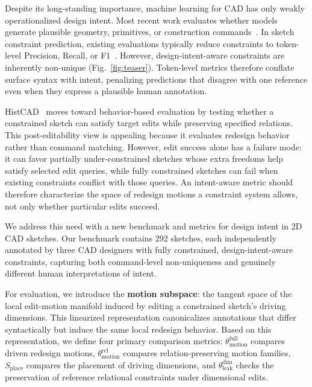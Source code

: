 Despite its long-standing importance, machine learning for CAD has only weakly operationalized design intent. Most recent work evaluates whether models generate plausible geometry, primitives, or construction commands~\cite{Wu_2021_ICCV,rukhovich2025cad}. In sketch constraint prediction, existing evaluations typically reduce constraints to token-level Precision, Recall, or F1~\cite{seff2021vitruvion,lin2026unisketch}. However, design-intent-aware constraints are inherently non-unique (Fig.~\ref{fig:teaser}). Token-level metrics therefore conflate surface syntax with intent, penalizing predictions that disagree with one reference even when they express a plausible human annotation.

HistCAD~\cite{dong2025histcad} moves toward behavior-based evaluation by testing whether a constrained sketch can satisfy target edits while preserving specified relations. This post-editability view is appealing because it evaluates redesign behavior rather than command matching. However, edit success alone has a failure mode: it can favor partially under-constrained sketches whose extra freedoms help satisfy selected edit queries, while fully constrained sketches can fail when existing constraints conflict with those queries. An intent-aware metric should therefore characterize the space of redesign motions a constraint system allows, not only whether particular edits succeed.

We address this need with a new benchmark and metrics for design intent in 2D CAD sketches. Our benchmark contains 292 sketches, each independently annotated by three CAD designers with fully constrained, design-intent-aware constraints, capturing both command-level non-uniqueness and genuinely different human interpretations of intent.

For evaluation, we introduce the \textbf{motion subspace}: the tangent space of the local edit-motion manifold induced by editing a constrained sketch's driving dimensions. This linearized representation canonicalizes annotations that differ syntactically but induce the same local redesign behavior. Based on this representation, we define four primary comparison metrics: $\theta_{\mathrm{motion}}^{\mathrm{full}}$ compares driven redesign motions, $\theta_{\mathrm{motion}}^{\mathrm{rel}}$ compares relation-preserving motion families, $S_{\mathrm{place}}$ compares the placement of driving dimensions, and $\theta_{\mathrm{leak}}^{\mathrm{dim}}$ checks the preservation of reference relational constraints under dimensional edits.

